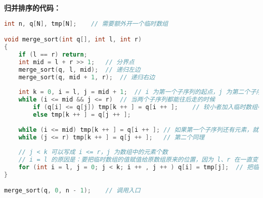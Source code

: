 \textbf{归并排序的代码：}
\begin{lstlisting}[language=cpp]
int n, q[N], tmp[N];    // 需要额外开一个临时数组

void merge_sort(int q[], int l, int r)
{
    if (l == r) return;
    int mid = l + r >> 1;   // 分界点
    merge_sort(q, l, mid);  // 递归左边
    merge_sort(q, mid + 1, r);  // 递归右边
    
    int k = 0, i = l, j = mid + 1;  // i 为第一个子序列的起点，j 为第二个子序列的起点
    while (i <= mid && j <= r)  // 当两个子序列都能往后走的时候
        if (q[i] <= q[j]) tmp[k ++ ] = q[i ++ ];    // 较小者加入临时数组中
        else tmp[k ++ ] = q[j ++ ];
    
    while (i <= mid) tmp[k ++ ] = q[i ++ ]; // 如果第一个子序列还有元素，就直接加
    while (j <= r) tmp[k ++ ] = q[j ++ ];   // 第二个同理
    
    // j < k 可以写成 i <= r，j 为数组中的元素个数
    // i = l 的原因是：要把临时数组的值赋值给原数组原来的位置，因为 l、r 在一直变化
    for (int i = l, j = 0; j < k; i ++ , j ++ ) q[i] = tmp[j];  // 把临时数组赋值给原数组
}

merge_sort(q, 0, n - 1);    // 调用入口

\end{lstlisting}
